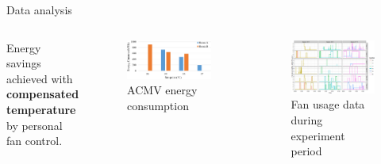 \documentclass[aspectratio=169]{beamer}
\begin{document}
\begin{frame}{Data analysis}
    \begin{columns}
        \begin{block}
            \small{Energy savings achieved with \textbf{compensated temperature} by personal fan control.}
        \end{block}
        \hspace{1cm}
        \begin{figure}
            \includegraphics[scale=0.15]{pic/acmv.png}
            \caption{\footnotesize{ACMV energy consumption}}
        \end{figure}
        \begin{figure}
            \includegraphics[scale=0.17]{pic/fan_usage.png}
            \caption{\footnotesize{Fan usage data during experiment period}}
        \end{figure}
    \end{columns}
\end{frame}

\end{document}
